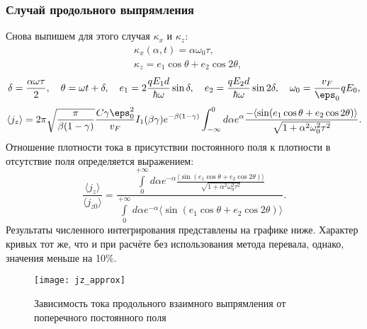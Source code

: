 \subsubsection{Случай продольного выпрямления}
\label{sec:pereval}
Снова выпишем для этого случая \( \kappa_x \)   и \( \kappa_z \):
\begin{align*}
    & \kappa_x(\alpha, t) = \alpha\omega_0\tau,\\
    & \kappa_z = e_1\cos\theta + e_2\cos2\theta,
\end{align*}
\begin{equation*}
  \delta = \frac{\alpha\omega\tau}{2},\quad
  \theta = \omega t + \delta,\quad
  e_1 = 2\frac{qE_1d}{\hbar\omega}\sin\delta,\quad
  e_2 = \frac{qE_2d}{\hbar\omega}\sin2\delta,\quad
  \omega_0 = \frac{v_F}{\eps_0}qE_0,
\end{equation*}
\begin{equation*}
    \langle j_z \rangle =
    2\pi\sqrt{\frac{\pi}{\beta(1-\gamma)}} \frac{C\gamma\eps_0^2}{v_F}
    I_1(\beta\gamma)e^{-\beta(1-\gamma)}
    \int_{-\infty}^{0}d \alpha e^\alpha
    \frac{-\langle\sin(e_1\cos\theta + e_2\cos2\theta)\rangle}{\sqrt{1+\alpha^2\omega_0^2\tau^2}}.
\end{equation*}
Отношение плотности тока в присутствии постоянного поля к плотности в отсутствие поля определяется выражением:
\begin{equation*}
    \frac{\langle j_z \rangle}{\langle j_{z0}\rangle}=\frac
    {\int\limits_0^{+\infty}d \alpha e^{-\alpha}
    \frac{\langle\sin(e_1\cos\theta +
    e_2\cos2\theta)\rangle}{\sqrt{1+\alpha^2\omega_0^2\tau^2}}}
    {\int\limits_0^{+\infty}d \alpha e^{-\alpha}
    \langle\sin(e_1\cos\theta + e_2\cos2\theta)\rangle}.
\end{equation*}
Результаты численного интегрирования представлены на графике ниже. Характер кривых тот же, что и при расчёте без использования метода перевала, однако, значения меньше на 10\%.
\begin{figure}[ht]
    \center
    \texttt{[image: jz\_approx]}
    \caption{Зависимость тока продольного взаимного выпрямления от поперечного постоянного поля}
\end{figure}

